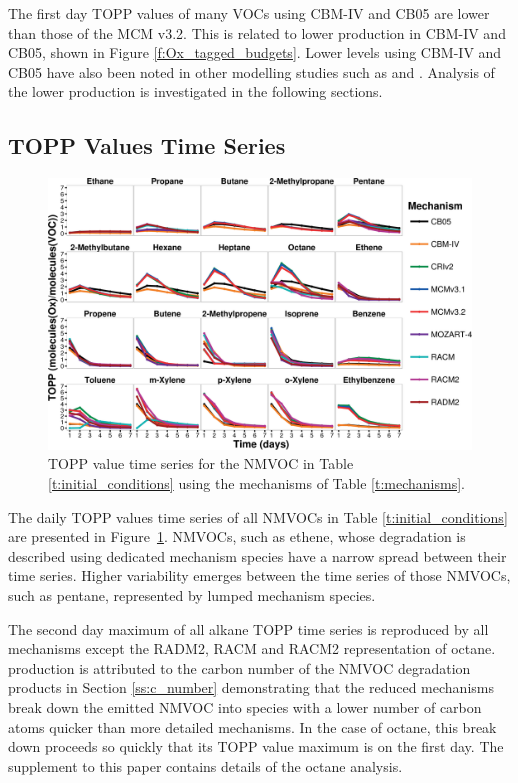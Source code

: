 The first day TOPP values of many VOCs using CBM-IV and CB05 are lower than those of the MCM v3.2. 
This is related to lower  production in CBM-IV and CB05, shown in Figure \ref{f:Ox_tagged_budgets}.
Lower  levels using CBM-IV and CB05 have also been noted in other modelling studies such as \citet{Luecken:2008, Emmerson:2009} and \citet{Saylor:2012}.
Analysis of the lower  production is investigated in the following sections.

\subsection{TOPP Values Time Series} \label{ss:profiles} %

\begin{figure}
    \begin{center}
        \includegraphics[width=\textwidth]{img/TOPP_daily_values_all_species}
    \end{center}
    \caption{TOPP value time series for the NMVOC in Table \ref{t:initial_conditions} using the mechanisms of Table \ref{t:mechanisms}.}
    \label{f:TOPP_dailies}
\end{figure}

The daily TOPP values time series of all NMVOCs in Table \ref{t:initial_conditions} are presented in \mbox{Figure \ref{f:TOPP_dailies}}. 
NMVOCs, such as ethene, whose degradation is described using dedicated mechanism species have a narrow spread between their time series. 
Higher variability emerges between the time series of those NMVOCs, such as pentane, represented by lumped mechanism species.

The second day maximum of all alkane TOPP time series is reproduced by all mechanisms except the RADM2, RACM and RACM2 representation of octane. 
 production is attributed to the carbon number of the NMVOC degradation products in Section \ref{ss:c_number} demonstrating that the reduced mechanisms break down the emitted NMVOC into species with a lower number of carbon atoms quicker than more detailed mechanisms. 
In the case of octane, this break down proceeds so quickly that its TOPP value maximum is on the first day. 
The supplement to this paper contains details of the octane analysis.

